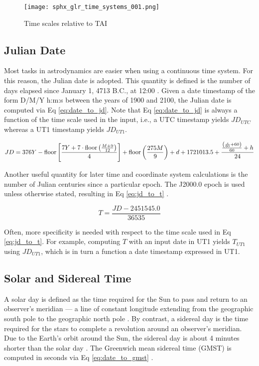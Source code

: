 \begin{figure}[ht]
  \centering
  \texttt{[image: sphx\_glr\_time\_systems\_001.png]}
  \caption{Time scales relative to TAI}
  \label{fig:time_scales}
\end{figure}

\subsection{Julian Date}

Most tasks in astrodynamics are easier when using a continuous time system. For this reason, the Julian date is adopted. This quantity is defined is the number of days elapsed since January 1, 4713 B.C., at 12:00 \cite{vallado4ed}. Given a date timestamp of the form D/M/Y h:m:s between the years of 1900 and 2100, the Julian date is computed via Eq \ref{eq:date_to_jd}. Note that Eq \ref{eq:date_to_jd} is always a function of the time scale used in the input, i.e., a UTC timestamp yields $JD_{UTC}$ whereas a UT1 timestamp yields $JD_{UT1}$.

\begin{equation} \label{eq:date_to_jd}
  JD = 376Y - \operatorname{floor}{\left[ \frac{7Y + 7 \cdot \operatorname{floor}{\left(\frac{M + 9}{12} \right)}}{4} \right]}
      + \operatorname{floor}{\left(\frac{275M}{9}\right)} 
      + d
      + 1721013.5
      + \frac{\frac{\left(\frac{s}{60} + 60\right)}{60} + h}{24}
\end{equation}

Another useful quantity for later time and coordinate system calculations is the number of Julian centuries since a particular epoch. The J2000.0 epoch is used unless otherwise stated, resulting in Eq \ref{eq:jd_to_t} \cite{vallado4ed}.

\begin{equation} \label{eq:jd_to_t}
  T = \frac{JD - 2451545.0}{36535}
\end{equation}

Often, more specificity is needed with respect to the time scale used in Eq \ref{eq:jd_to_t}. For example, computing $T$ with an input date in UT1 yields $T_{UT1}$ using $JD_{UT1}$, which is in turn a function a date timestamp expressed in UT1. 

\subsection{Solar and Sidereal Time}

A solar day is defined as the time required for the Sun to pass and return to an observer's meridian --- a line of constant longitude extending from the geographic south pole to the geographic north pole \cite{vallado4ed}. By contrast, a sidereal day is the time required for the stars to complete a revolution around an observer's meridian. Due to the Earth's orbit around the Sun, the sidereal day is about 4 minutes shorter than the solar day \cite{vallado4ed}. The Greenwich mean sidereal time (GMST) is computed in seconds via Eq \ref{eq:date_to_gmst} \cite{frueh2019notes}.

